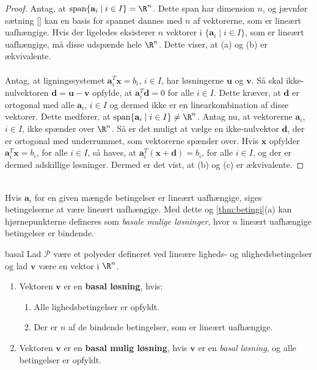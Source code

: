 \begin{proof}
Antag, at $\text{span}\{\textbf{a}_i \mid i \in I\}= \R^n$.
Dette span har dimension $n$, og jævnfør sætning \ref{} %
kan en basis for spannet dannes med $n$ af vektorerne, som er lineært uafhængige.
%
Hvis der ligeledes eksisterer $n$ vektorer i $\{\textbf{a}_i \mid i \in I\}$, som er lineært uafhængige, må disse udspænde hele $\R^n$.
Dette viser, at (a) og (b) er ækvivalente.\\\\
%
Antag, at ligningssystemet $\textbf{a}^T_i\textbf{x}=b_i$, $i \in I$, har løsningerne $\textbf{u}$ og $\textbf{v}$.
Så skal ikke-nulvektoren $\textbf{d} = \textbf{u} - \textbf{v}$ opfylde, at $\textbf{a}^T_i\textbf{d}=0$ for alle $i \in I$.
Dette kræver, at $\textbf{d}$ er ortogonal med alle $\textbf{a}_i$, $i \in I$ og dermed ikke er en linearkombination af disse vektorer.
Dette medfører, at $\text{span}\{\textbf{a}_i \mid i \in I\} \neq \R^n$.
%
Antag nu, at vektorerne $\textbf{a}_i$, $i \in I$, ikke spænder over $\R^n$.
Så er det muligt at vælge en ikke-nulvektor $\textbf{d}$, der er ortogonal med underrummet, som vektorerne spænder over.
Hvis $\textbf{x}$ opfylder  $\textbf{a}^T_i\textbf{x}= b_i$, for alle $i \in I$, så haves, at $\textbf{a}^T_i(\textbf{x}+\textbf{d})= b_i$, for alle $i \in I$, og der er dermed adskillige løsninger.
Dermed er det vist, at (b) og (c) er ækvivalente.
\end{proof}\\
%
Hvis $\textbf{a}_i$ for en given mængde betingelser er lineært uafhængige, siges betingelserne at være lineært uafhængige.
Med dette og \ref{thm:betingi}(a) kan hjørnepunkterne defineres som \textit{basale mulige løsninger}, hvor $n$ lineært uafhængige betingelser er bindende.
%
\begin{defn}{}{basal}
Lad $\mathcal{P}$ være et polyeder defineret ved lineære ligheds- og ulighedsbetingelser og lad $\textbf{v}$ være en vektor i $\R^n$.
%
\begin{enumerate}[label=(\alph*)]
\item Vektoren $\textbf{v}$ er en \textbf{basal løsning}, hvis:
%
\begin{enumerate}[label=(\roman*)]
\item Alle lighedsbetingelser er opfyldt.
\item Der er $n$ af de bindende betingelser, som er lineært uafhængige.
\end{enumerate}
%
\item Vektoren $\textbf{v}$ er en \textbf{basal mulig løsning}, hvis $\textbf{v}$ er en \textit{basal løsning}, og alle betingelser er opfyldt.
\end{enumerate}
\end{defn}\noindent

